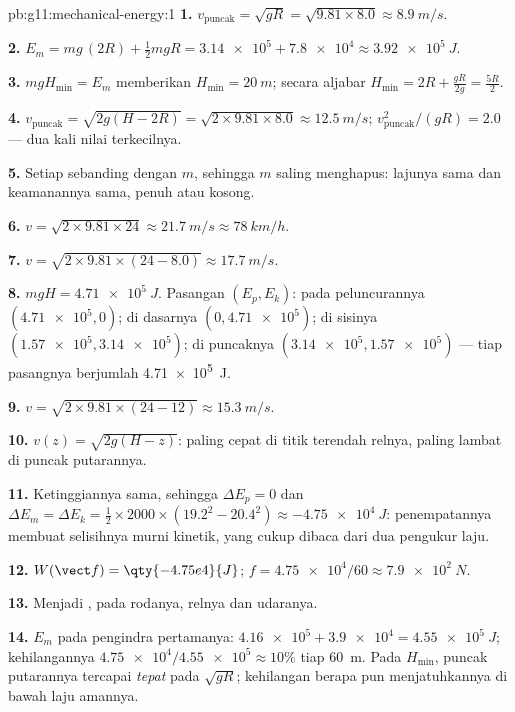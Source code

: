 \begin{solution}{pb:g11:mechanical-energy:1}
\textbf{1.} $v_{\text{puncak}} = \sqrt{gR} = \sqrt{9.81 \times 8.0}
\approx \qty{8.9}{m/s}$.

\textbf{2.} $E_m = mg\,(2R) + \tfrac12 m gR = \num{3.14e5} +
\num{7.8e4} \approx \qty{3.92e5}{J}$.

\textbf{3.} $mgH_{\min} = E_m$ memberikan $H_{\min} = \qty{20}{m}$;
secara aljabar $H_{\min} = 2R + \frac{gR}{2g} = \frac{5R}{2}$.

\textbf{4.} $v_{\text{puncak}} = \sqrt{2g(H - 2R)} =
\sqrt{2 \times 9.81 \times 8.0} \approx \qty{12.5}{m/s}$;
$v_{\text{puncak}}^2/(gR) = 2.0$ --- dua kali nilai terkecilnya.

\textbf{5.} Setiap  sebanding dengan $m$, sehingga $m$ saling
menghapus: lajunya sama dan keamanannya sama, penuh atau kosong.

\textbf{6.} $v = \sqrt{2 \times 9.81 \times 24} \approx \qty{21.7}{m/s}
\approx \qty{78}{km/h}$.

\textbf{7.} $v = \sqrt{2 \times 9.81 \times (24 - 8.0)} \approx
\qty{17.7}{m/s}$.

\textbf{8.} $mgH = \qty{4.71e5}{J}$. Pasangan $(E_p, E_k)$: pada
peluncurannya $(\num{4.71e5}, 0)$; di dasarnya $(0, \num{4.71e5})$; di
sisinya $(\num{1.57e5}, \num{3.14e5})$; di puncaknya
$(\num{3.14e5}, \num{1.57e5})$ --- tiap pasangnya berjumlah
\qty{4.71e5}{J}.

\textbf{9.} $v = \sqrt{2 \times 9.81 \times (24 - 12)} \approx
\qty{15.3}{m/s}$.

\textbf{10.} $v(z) = \sqrt{2g(H - z)}$: paling cepat di titik terendah
relnya, paling lambat di puncak putarannya.

\textbf{11.} Ketinggiannya sama, sehingga $\Delta E_p = 0$ dan
$\Delta E_m = \Delta E_k = \tfrac12 \times 2000 \times (19.2^2 -
20.4^2) \approx \qty{-4.75e4}{J}$: penempatannya membuat selisihnya
murni kinetik, yang cukup dibaca dari dua pengukur laju.

\textbf{12.} $W(\vect f) = \qty{-4.75e4}{J}$;
$f = \num{4.75e4}/60 \approx \qty{7.9e2}{N}$.

\textbf{13.} Menjadi , pada rodanya, relnya dan udaranya.

\textbf{14.} $E_m$ pada pengindra pertamanya:
$\num{4.16e5} + \num{3.9e4} =
\qty{4.55e5}{J}$; kehilangannya
$\num{4.75e4}/\num{4.55e5} \approx 10\%$ tiap \qty{60}{m}. Pada
$H_{\min}$, puncak putarannya tercapai \emph{tepat} pada $\sqrt{gR}$;
kehilangan berapa pun menjatuhkannya di bawah laju amannya.


\end{solution}
